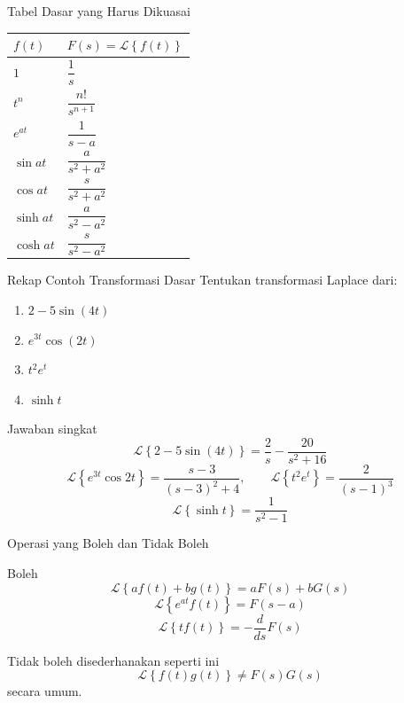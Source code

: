 \documentclass[aspectratio=169,10pt]{beamer}
\newcommand{\Lcal}{\mathcal{L}}
\newcommand{\Lap}[1]{\Lcal\left\{#1\right\}}
\begin{document}
\begin{frame}{Tabel Dasar yang Harus Dikuasai}
\small
\begin{center}
\begin{tabular}{>{\centering\arraybackslash}m{} >{\centering\arraybackslash}m{}}
\toprule
$f(t)$ & $F(s)=\Lap{f(t)}$\\
\midrule
$1$ & $\dfrac{1}{s}$\\[2mm]
$t^n$ & $\dfrac{n!}{s^{n+1}}$\\[2mm]
$e^{at}$ & $\dfrac{1}{s-a}$\\[2mm]
$\sin at$ & $\dfrac{a}{s^2+a^2}$\\[2mm]
$\cos at$ & $\dfrac{s}{s^2+a^2}$\\[2mm]
$\sinh at$ & $\dfrac{a}{s^2-a^2}$\\[2mm]
$\cosh at$ & $\dfrac{s}{s^2-a^2}$\\
\bottomrule
\end{tabular}
\end{center}
\end{frame}

\begin{frame}{Rekap Contoh Transformasi Dasar}
Tentukan transformasi Laplace dari:
\begin{enumerate}
\item $2-5\sin(4t)$
\item $e^{3t}\cos(2t)$
\item $t^2 e^t$
\item $\sinh t$
\end{enumerate}
\vspace{1mm}
\begin{exampleblock}{Jawaban singkat}
\[
\Lap{2-5\sin(4t)}=\frac{2}{s}-\frac{20}{s^2+16}
\]
\[
\Lap{e^{3t}\cos 2t}=\frac{s-3}{(s-3)^2+4},\qquad \Lap{t^2e^t}=\frac{2}{(s-1)^3}
\]
\[
\Lap{\sinh t}=\frac{1}{s^2-1}
\]
\end{exampleblock}
\end{frame}

\begin{frame}{Operasi yang Boleh dan Tidak Boleh}
\begin{block}{Boleh}
\[
\Lap{af(t)+bg(t)}=aF(s)+bG(s)
\]
\[
\Lap{e^{at}f(t)}=F(s-a)
\]
\[
\Lap{tf(t)}=-\frac{d}{ds}F(s)
\]
\end{block}
\begin{alertblock}{Tidak boleh disederhanakan seperti ini}
\[
\Lap{f(t)g(t)} \neq F(s)G(s)
\]
secara umum.
\end{alertblock}
\end{frame}
\end{document}
